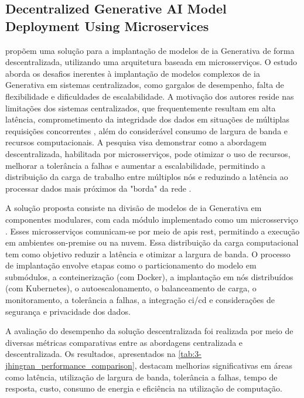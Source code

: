 \subsection{Decentralized Generative AI Model Deployment Using Microservices \cite{jhingran_decentralized_2024}}
\label{subsec:jhingran_decentralized}

\textcite{jhingran_decentralized_2024} propõem uma solução para a implantação de modelos de \acrfull{ia} Generativa de forma descentralizada, utilizando uma arquitetura baseada em microsserviços. O estudo aborda os desafios inerentes à implantação de modelos complexos de \gls{ia} Generativa em sistemas centralizados, como gargalos de desempenho, falta de flexibilidade e dificuldades de escalabilidade. A motivação dos autores reside nas limitações dos sistemas centralizados, que frequentemente resultam em alta latência, comprometimento da integridade dos dados em situações de múltiplas requisições concorrentes \cite{lu_computing_2024}, além do considerável consumo de largura de banda e recursos computacionais. A pesquisa visa demonstrar como a abordagem descentralizada, habilitada por microsserviços, pode otimizar o uso de recursos, melhorar a tolerância a falhas e aumentar a escalabilidade, permitindo a distribuição da carga de trabalho entre múltiplos nós e reduzindo a latência ao processar dados mais próximos da "borda" da rede \cite{jhingran_performance_2021}.

A solução proposta consiste na divisão de modelos de \gls{ia} Generativa em componentes modulares, com cada módulo implementado como um microsserviço \cite{gustrowsky_using_2024}. Esses microsserviços comunicam-se por meio de \acrfull{api}s \gls{rest}, permitindo a execução em ambientes on-premise ou na nuvem. Essa distribuição da carga computacional tem como objetivo reduzir a latência e otimizar a largura de banda. O processo de implantação envolve etapas como o particionamento do modelo em submódulos, a conteinerização (com Docker), a implantação em nós distribuídos (com Kubernetes), o autoescalonamento, o balanceamento de carga, o monitoramento, a tolerância a falhas, a integração \acrfull{ci/cd} e considerações de segurança e privacidade dos dados.

A avaliação do desempenho da solução descentralizada foi realizada por meio de diversas métricas comparativas entre as abordagens centralizada e descentralizada. Os resultados, apresentados na  \autoref{tab:3-jhingran_performance_comparison}, destacam melhorias significativas em áreas como latência, utilização de largura de banda, tolerância a falhas, tempo de resposta, custo, consumo de energia e eficiência na utilização de computação.

